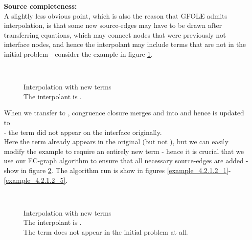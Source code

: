 \textbf{Source completeness:}\\
A slightly less obvious point, which is also the reason that GFOLE admits interpolation, is that some new source-edges may have to be drawn after transferring equations, which may connect nodes that were previously not interface nodes, and hence the interpolant may include terms that are not in the initial problem - consider the example in figure \ref{example_4.2.1.2_0}.

\begin{figure}
\\
\caption{Interpolation with new terms\\
The interpolant is .\\
}
\label{example_4.2.1.2_0}
\end{figure}

When we transfer  to , congruence closure merges  and  into  and hence  is updated to\\
  - the term  did not appear on the interface originally.\\
Here the term  already appears in the original  (but not ), but we can easily modify the example to require an entirely new term - hence it is crucial that we use our EC-graph algorithm to ensure that all necessary source-edges are added - show in figure \ref{example_4.2.1.3_0}. The algorithm run is show in figures \ref{example_4.2.1.2_1}-\ref{example_4.2.1.2_5}.


\begin{figure}
\\
\caption{Interpolation with new terms\\
The interpolant is .\\
The term  does not appear in the initial problem at all.
}
\label{example_4.2.1.3_0}
\end{figure}



